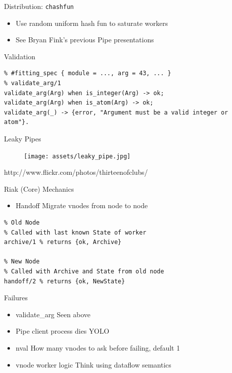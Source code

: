 \documentclass[compress]{beamer}
\begin{document}
\begin{frame}{Distribution: \tt{chashfun}}
\begin{itemize}
  \item Use random uniform hash fun to saturate workers
  \item See Bryan Fink's previous Pipe presentations
\end{itemize}
\end{frame}

\begin{frame}[containsverbatim]{Validation}
\begin{lstlisting}
% #fitting_spec { module = ..., arg = 43, ... }
% validate_arg/1
validate_arg(Arg) when is_integer(Arg) -> ok;
validate_arg(Arg) when is_atom(Arg) -> ok;
validate_arg(_) -> {error, "Argument must be a valid integer or atom"}.
\end{lstlisting}
\end{frame}

\begin{frame}{Leaky Pipes}
  \begin{figure}
    \centering
    \texttt{[image: assets/leaky\_pipe.jpg]}
  \end{figure}
  \small{http://www.flickr.com/photos/thirteenofclubs/}
\end{frame}

\begin{frame}[containsverbatim]{Riak (Core) Mechanics}
\begin{itemize}
  \item \Large{Handoff} \newline \small{Migrate vnodes from node to node}
\end{itemize}
\begin{lstlisting}
% Old Node
% Called with last known State of worker
archive/1 % returns {ok, Archive}

% New Node
% Called with Archive and State from old node
handoff/2 % returns {ok, NewState}
\end{lstlisting}
\end{frame}

\begin{frame}{Failures}
  \begin{itemize}
    \item{\Large{validate\_arg} \newline \small{Seen above}}
    \item{\Large{Pipe client process dies} \newline \small{YOLO}}
    \item{\Large{nval} \newline \small{How many vnodes to ask before failing, default 1}}
    \item{\Large{vnode worker logic} \newline \small{Think using dataflow semantics}}
  \end{itemize}
\end{frame}
\end{document}
